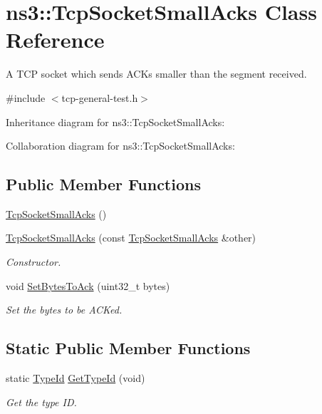 \hypertarget{classns3_1_1TcpSocketSmallAcks}{}\section{ns3\+:\+:Tcp\+Socket\+Small\+Acks Class Reference}
\label{classns3_1_1TcpSocketSmallAcks}


A T\+CP socket which sends A\+C\+Ks smaller than the segment received.  




{\ttfamily \#include $<$tcp-\/general-\/test.\+h$>$}



Inheritance diagram for ns3\+:\+:Tcp\+Socket\+Small\+Acks\+:


Collaboration diagram for ns3\+:\+:Tcp\+Socket\+Small\+Acks\+:
\subsection*{Public Member Functions}
\begin{DoxyCompactItemize}
\item 
\hyperlink{classns3_1_1TcpSocketSmallAcks_a75637ce40a78bbed084b5ac83ceb13f4}{Tcp\+Socket\+Small\+Acks} ()
\item 
\hyperlink{classns3_1_1TcpSocketSmallAcks_abf2305247f05ac4884f3c3f5ffa068ac}{Tcp\+Socket\+Small\+Acks} (const \hyperlink{classns3_1_1TcpSocketSmallAcks}{Tcp\+Socket\+Small\+Acks} \&other)
\begin{DoxyCompactList}\small\item\em Constructor. \end{DoxyCompactList}\item 
void \hyperlink{classns3_1_1TcpSocketSmallAcks_ada016a112c4f8b2f7502474a1df21d7d}{Set\+Bytes\+To\+Ack} (uint32\+\_\+t bytes)
\begin{DoxyCompactList}\small\item\em Set the bytes to be A\+C\+Ked. \end{DoxyCompactList}\end{DoxyCompactItemize}
\subsection*{Static Public Member Functions}
\begin{DoxyCompactItemize}
\item 
static \hyperlink{classns3_1_1TypeId}{Type\+Id} \hyperlink{classns3_1_1TcpSocketSmallAcks_a5cf28115e514e3a1421ddf2f8cb86de6}{Get\+Type\+Id} (void)
\begin{DoxyCompactList}\small\item\em Get the type ID. \end{DoxyCompactList}\end{DoxyCompactItemize}
